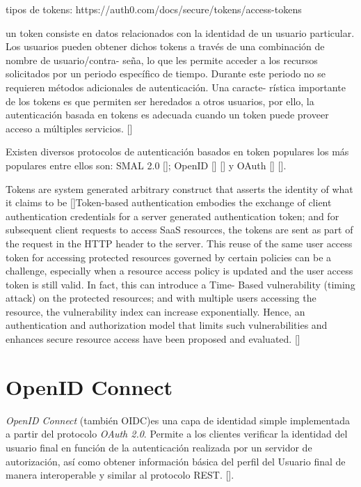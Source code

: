 tipos de tokens: https://auth0.com/docs/secure/tokens/access-tokens

un token consiste en datos relacionados con la identidad de un usuario particular. Los usuarios pueden obtener dichos tokens a través de una combinación de nombre de usuario/contra- seña, lo que les permite acceder a los recursos solicitados por un periodo específico de tiempo. Durante este periodo no se requieren métodos adicionales de autenticación. Una caracte- rística importante de los tokens es que permiten ser heredados a otros usuarios, por ello, la autenticación basada en tokens es adecuada cuando un token puede proveer acceso a múltiples servicios. [\cite{banerjee2018token}] %

Existen diversos protocolos de autenticación basados en token populares los más populares entre ellos son: SMAL 2.0 [\cite{cantor2005assertions}]; OpenID [\cite{recordon2006openid}] [\cite{mainka2017sok}] y OAuth [\cite{hardt2012oauth}] [\cite{richer2017oauth}]. 

Tokens are system generated arbitrary construct that asserts the identity of what it claims to be [\cite{zheng2014token}]Token-based authentication embodies the exchange of client authentication credentials for a server generated authentication token; and for subsequent client requests to access SaaS resources, the tokens are sent as part of the request in the HTTP header to the server. This reuse of the same user access token for accessing protected resources governed by certain policies can be a challenge, especially when a resource access policy is updated and the user access token is still valid. In fact, this can introduce a Time- Based vulnerability (timing attack) on the protected resources; and with multiple users accessing the resource, the vulnerability index can increase exponentially. Hence, an authentication and authorization model that limits such vulnerabilities and enhances secure resource access have been proposed and evaluated. [\cite{ethelbert2017json}]

\section{OpenID Connect}
\textit{OpenID Connect}  (también OIDC)es una capa de identidad simple implementada a partir del protocolo \textit{OAuth 2.0}. Permite a los clientes verificar la identidad del usuario final en función de la autenticación realizada por un servidor de autorización, así como obtener información básica del perfil del Usuario final de manera interoperable y similar al protocolo REST. [\cite{openid-doc}]. 

